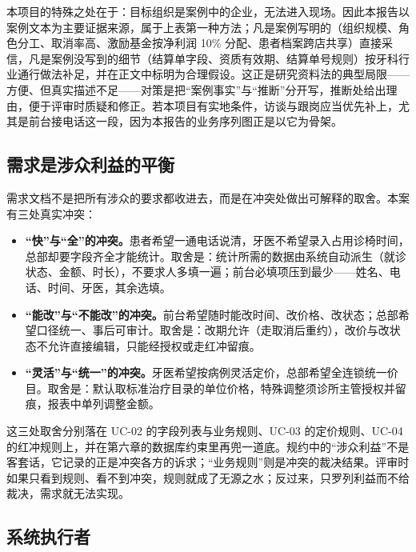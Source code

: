 \documentclass[11pt,a4paper]{ctexart}
\begin{document}
本项目的特殊之处在于：目标组织是案例中的企业，无法进入现场。因此本报告以案例文本为主要证据来源，属于上表第一种方法；凡是案例写明的（组织规模、角色分工、取消率高、激励基金按净利润 10\% 分配、患者档案跨店共享）直接采信，凡是案例没写到的细节（结算单字段、资质有效期、结算单号规则）按牙科行业通行做法补足，并在正文中标明为合理假设。这正是研究资料法的典型局限——方便、但真实描述不足——对策是把“案例事实”与“推断”分开写，推断处给出理由，便于评审时质疑和修正。若本项目有实地条件，访谈与跟岗应当优先补上，尤其是前台接电话这一段，因为本报告的业务序列图正是以它为骨架。

\subsection{需求是涉众利益的平衡}

需求文档不是把所有涉众的要求都收进去，而是在冲突处做出可解释的取舍。本案有三处真实冲突：

\begin{itemize}[leftmargin=1.6em,topsep=3pt,itemsep=3pt]
  \item \textbf{“快”与“全”的冲突。}患者希望一通电话说清，牙医不希望录入占用诊椅时间，总部却要字段齐全才能统计。取舍是：统计所需的数据由系统自动派生（就诊状态、金额、时长），不要求人多填一遍；前台必填项压到最少——姓名、电话、时间、牙医，其余选填。
  \item \textbf{“能改”与“不能改”的冲突。}前台希望随时能改时间、改价格、改状态；总部希望口径统一、事后可审计。取舍是：改期允许（走取消后重约），改价与改状态不允许直接编辑，只能经授权或走红冲留痕。
  \item \textbf{“灵活”与“统一”的冲突。}牙医希望按病例灵活定价，总部希望全连锁统一价目。取舍是：默认取标准治疗目录的单位价格，特殊调整须诊所主管授权并留痕，报表中单列调整金额。
\end{itemize}

这三处取舍分别落在 UC-02 的字段列表与业务规则、UC-03 的定价规则、UC-04 的红冲规则上，并在第六章的数据库约束里再兜一道底。规约中的“涉众利益”不是客套话，它记录的正是冲突各方的诉求；“业务规则”则是冲突的裁决结果。评审时如果只看到规则、看不到冲突，规则就成了无源之水；反过来，只罗列利益而不给裁决，需求就无法实现。

\subsection{系统执行者}
\end{document}
